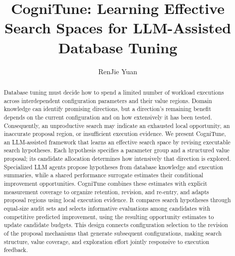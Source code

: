 
\title{CogniTune: Learning Effective Search Spaces for LLM-Assisted Database Tuning}

\author{RenJie Yuan}
\maketitle

\begin{abstract}
Database tuning must decide how to spend a limited number of workload executions across interdependent configuration parameters and their value regions. Domain knowledge can identify promising directions, but a direction's remaining benefit depends on the current configuration and on how extensively it has been tested. Consequently, an unproductive search may indicate an exhausted local opportunity, an inaccurate proposal region, or insufficient execution evidence. We present CogniTune, an LLM-assisted framework that learns an effective search space by revising executable search hypotheses. Each hypothesis specifies a parameter group and a structured value proposal; its candidate allocation determines how intensively that direction is explored. Specialized LLM agents propose hypotheses from database knowledge and execution summaries, while a shared performance surrogate estimates their conditional improvement opportunities. CogniTune combines these estimates with explicit measurement coverage to organize retention, revision, and re-entry, and adapts proposal regions using local execution evidence. It compares search hypotheses through equal-size audit sets and selects informative evaluations among candidates with competitive predicted improvement, using the resulting opportunity estimates to update candidate budgets. This design connects configuration selection to the revision of the proposal mechanisms that generate subsequent configurations, making search structure, value coverage, and exploration effort jointly responsive to execution feedback.
\end{abstract}

